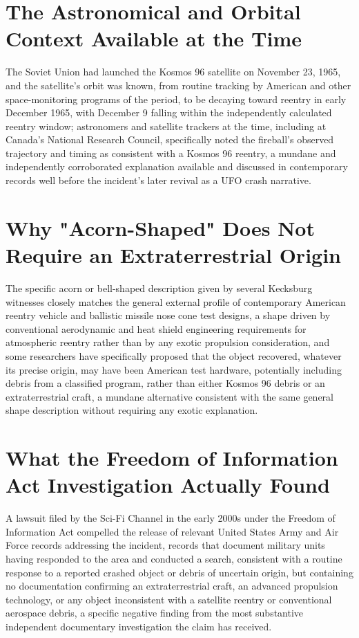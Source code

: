 \documentclass[11pt]{article}
\begin{document}
\section{The Astronomical and Orbital Context Available at the Time}

The Soviet Union had launched the Kosmos 96 satellite on November 23, 1965, and the satellite's orbit was known, from routine tracking by American and other space-monitoring programs of the period, to be decaying toward reentry in early December 1965, with December 9 falling within the independently calculated reentry window; astronomers and satellite trackers at the time, including at Canada's National Research Council, specifically noted the fireball's observed trajectory and timing as consistent with a Kosmos 96 reentry, a mundane and independently corroborated explanation available and discussed in contemporary records well before the incident's later revival as a UFO crash narrative.

\section{Why "Acorn-Shaped" Does Not Require an Extraterrestrial Origin}

The specific acorn or bell-shaped description given by several Kecksburg witnesses closely matches the general external profile of contemporary American reentry vehicle and ballistic missile nose cone test designs, a shape driven by conventional aerodynamic and heat shield engineering requirements for atmospheric reentry rather than by any exotic propulsion consideration, and some researchers have specifically proposed that the object recovered, whatever its precise origin, may have been American test hardware, potentially including debris from a classified program, rather than either Kosmos 96 debris or an extraterrestrial craft, a mundane alternative consistent with the same general shape description without requiring any exotic explanation.

\section{What the Freedom of Information Act Investigation Actually Found}

A lawsuit filed by the Sci-Fi Channel in the early 2000s under the Freedom of Information Act compelled the release of relevant United States Army and Air Force records addressing the incident, records that document military units having responded to the area and conducted a search, consistent with a routine response to a reported crashed object or debris of uncertain origin, but containing no documentation confirming an extraterrestrial craft, an advanced propulsion technology, or any object inconsistent with a satellite reentry or conventional aerospace debris, a specific negative finding from the most substantive independent documentary investigation the claim has received.
\end{document}
